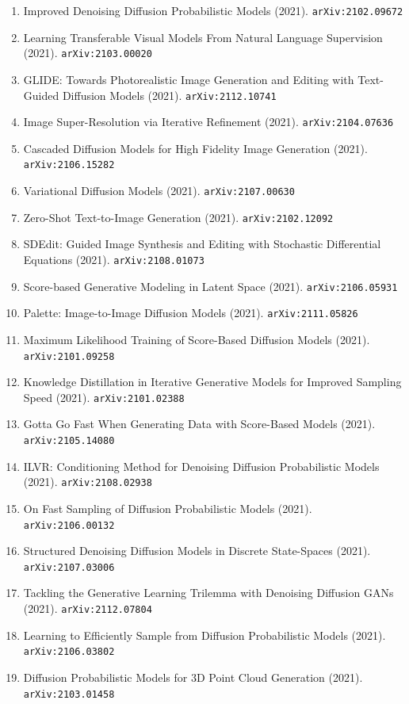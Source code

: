 \documentclass[11pt]{article}
\begin{document}
\begin{enumerate}
  \item Improved Denoising Diffusion Probabilistic Models (2021). \texttt{arXiv:2102.09672}
  \item Learning Transferable Visual Models From Natural Language Supervision (2021). \texttt{arXiv:2103.00020}
  \item GLIDE: Towards Photorealistic Image Generation and Editing with
  Text-Guided Diffusion Models (2021). \texttt{arXiv:2112.10741}
  \item Image Super-Resolution via Iterative Refinement (2021). \texttt{arXiv:2104.07636}
  \item Cascaded Diffusion Models for High Fidelity Image Generation (2021). \texttt{arXiv:2106.15282}
  \item Variational Diffusion Models (2021). \texttt{arXiv:2107.00630}
  \item Zero-Shot Text-to-Image Generation (2021). \texttt{arXiv:2102.12092}
  \item SDEdit: Guided Image Synthesis and Editing with Stochastic Differential
  Equations (2021). \texttt{arXiv:2108.01073}
  \item Score-based Generative Modeling in Latent Space (2021). \texttt{arXiv:2106.05931}
  \item Palette: Image-to-Image Diffusion Models (2021). \texttt{arXiv:2111.05826}
  \item Maximum Likelihood Training of Score-Based Diffusion Models (2021). \texttt{arXiv:2101.09258}
  \item Knowledge Distillation in Iterative Generative Models for Improved
  Sampling Speed (2021). \texttt{arXiv:2101.02388}
  \item Gotta Go Fast When Generating Data with Score-Based Models (2021). \texttt{arXiv:2105.14080}
  \item ILVR: Conditioning Method for Denoising Diffusion Probabilistic Models (2021). \texttt{arXiv:2108.02938}
  \item On Fast Sampling of Diffusion Probabilistic Models (2021). \texttt{arXiv:2106.00132}
  \item Structured Denoising Diffusion Models in Discrete State-Spaces (2021). \texttt{arXiv:2107.03006}
  \item Tackling the Generative Learning Trilemma with Denoising Diffusion GANs (2021). \texttt{arXiv:2112.07804}
  \item Learning to Efficiently Sample from Diffusion Probabilistic Models (2021). \texttt{arXiv:2106.03802}
  \item Diffusion Probabilistic Models for 3D Point Cloud Generation (2021). \texttt{arXiv:2103.01458}

\end{enumerate}
\end{document}
